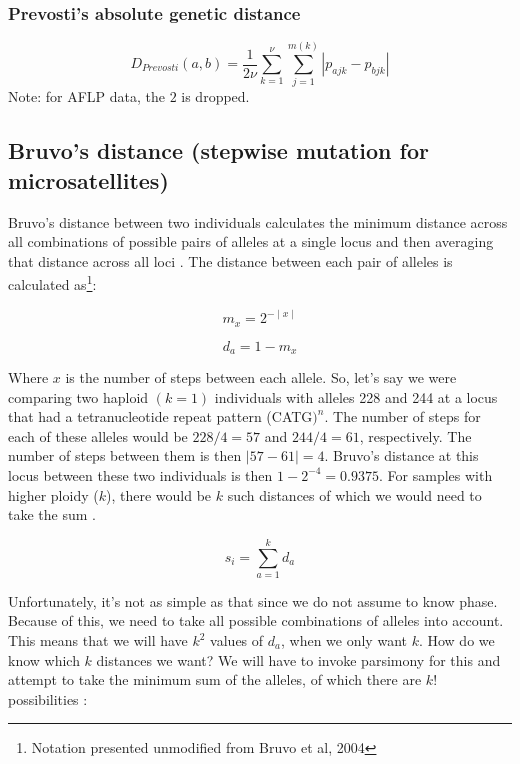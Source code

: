 \documentclass[letterpaper]{article}\usepackage[]{graphicx}\usepackage[]{color}
\begin{document}
\subsubsection{Prevosti's absolute genetic distance}
\label{distance:prevosti}
\begin{equation}
  D_{Prevosti}(a,b)=\frac{1}{2{\nu}} \sum_{k=1}^{\nu} \sum_{j=1}^{m(k)}
  |p_{ajk} - p_{bjk}|
\end{equation}
Note: for AFLP data, the $2$ is dropped. 

\subsection{Bruvo's distance (stepwise mutation for microsatellites)}
\label{bruvo}

Bruvo's distance between two individuals calculates the minimum distance across
all combinations of possible pairs of alleles at a single locus and then
averaging that distance across all loci \citep{Bruvo:2004}. The distance between
each pair of alleles is calculated as\footnote{Notation presented unmodified
from Bruvo et al, 2004}\citep{Bruvo:2004}:

\begin{equation}
\label{eq:m_x}
m_x = 2^{-\mid x \mid}
\end{equation}

\begin{equation}
\label{eq:d_a}
d_a = 1 - m_x
\end{equation}

Where $x$ is the number of steps between each allele. So, let's say we were
comparing two haploid $(k = 1)$ individuals with alleles 228 and 244 at a locus
that had a tetranucleotide repeat pattern (CATG$)^n$. The number of steps for
each of these alleles would be $228/4 = 57$ and $244/4 =61$, respectively. The
number of steps between them is then $\mid 57 - 61 \mid = 4$. Bruvo's distance
at this locus between these two individuals is then $1-2^{-4} = 0.9375$. For
samples with higher ploidy ($k$), there would be $k$ such distances of which we
would need to take the sum \citep{Bruvo:2004}.

\begin{equation}
\label{eq:s_i}
s_i = \displaystyle \sum_{a=1}^{k} d_a
\end{equation}

Unfortunately, it's not as simple as that since we do not assume to know phase.
Because of this, we need to take all possible combinations of alleles into
account. This means that we will have $k^2$ values of $d_a$, when we only want
$k$. How do we know which $k$ distances we want? We will have to invoke
parsimony for this and attempt to take the minimum sum of the alleles, of which
there are $k!$ possibilities \citep{Bruvo:2004}:
\end{document}
